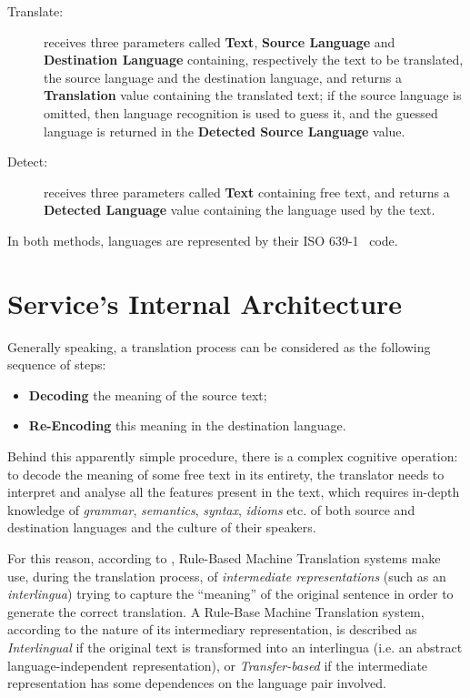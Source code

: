 \documentclass[11pt]{article}
\begin{document}
\begin{description}
 \item[Translate:] receives three parameters called {\bf Text}, {\bf Source Language} and {\bf Destination Language} containing, respectively the text to be translated, the source language and the destination language, and returns a {\bf Translation} value containing the translated text; if the source language is omitted, then language recognition is used to guess it, and the guessed language is returned in the {\bf Detected Source Language} value.
 \item[Detect:] receives three parameters called {\bf Text} containing free text, and returns a {\bf Detected Language} value containing the language used by the text.
\end{description}

In both methods, languages are represented by their ISO 639-1~\citep{ISO:639-1} code.

\section{Service's Internal Architecture}

Generally speaking, a translation process can be considered as the following sequence of steps:

\begin{itemize}
 \item {\bf Decoding} the meaning of the source text;
 \item {\bf Re-Encoding} this meaning in the destination language.
\end{itemize}

Behind this apparently simple procedure, there is a complex cognitive operation: to decode the meaning of some free text in its entirety, the translator needs to interpret and analyse all the features present in the text, which requires in-depth knowledge of \emph{grammar}, \emph{semantics}, \emph{syntax}, \emph{idioms} etc. of both source and destination languages and the culture of their speakers.

For this reason, according to \cite{arnoldea}, Rule-Based Machine Translation systems make use, during the translation process, of \emph{intermediate representations} (such as an \emph{interlingua}) trying to capture the ``meaning'' of the original sentence in order to generate the  correct translation. A Rule-Base Machine Translation system, according to the nature of its intermediary representation, is described as \emph{Interlingual} if the original text is transformed into an interlingua (i.e. an abstract language-independent representation), or \emph{Transfer-based} if the intermediate representation has some dependences on the language pair involved.
\end{document}
